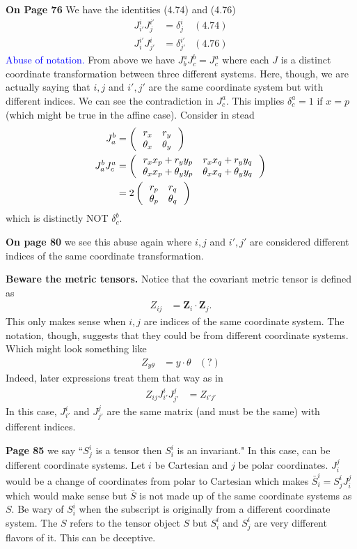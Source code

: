 \documentclass[12pt,a4paper]{report}
\newcommand{\BLUE}[1]{\textcolor{blue}{#1}}
\newcommand{\VK}[1]{\textbf{#1}}
\begin{document}
\begin{description}
	\item \textbf{On Page 76} We have the identities (4.74) and (4.76)
	\begin{align*}
		J^i_{i'}J^{i'}_j &= \delta^i_j & (4.74)\\
		J^{i'}_iJ^i_{j'} &= \delta^{i'}_{j'} & (4.76)
	\end{align*}\BLUE{Abuse of notation.}  From above we have $J^a_bJ^b_c = J^a_c$ where each $J$ is a distinct coordinate transformation between three different systems.  Here, though, we are actually saying that $i,j$ and $i',j'$ are the same coordinate system but with different indices.  We can see the contradiction in $J^a_c$.  This implies $\delta^a_c = 1$ if $x=p$ (which might be true in the affine case).  Consider in stead
	\begin{align*}
		J^b_a &= \left (\,  \begin{array}{c c} r_x&r_y \\ \theta_x & \theta_y \end{array}  \,\right ) \\
		J^b_a J^a_c &= \left (\,  \begin{array}{c c} r_xx_p+r_yy_p&r_xx_q+r_yy_q \\ \theta_xx_p+\theta_yy_p & \theta_xx_q+\theta_yy_q \end{array}  \,\right ) \\
		&= 2\left (\,  \begin{array}{c c} r_p&r_q \\ \theta_p & \theta_q \end{array}  \,\right )
	\end{align*}which is distinctly NOT $\delta^b_c$.
	
	\item \textbf{On page 80} we see this abuse again where $i,j$ and $i',j'$ are considered different indices of the same coordinate transformation.
	
	\item \textbf{Beware the metric tensors.}  Notice that the covariant metric tensor is defined as
	\begin{align*}
		Z_{ij} &= \VK{Z}_i\cdot\VK{Z}_j.
	\end{align*}This only makes sense when $i,j$ are indices of the same coordinate system.  The notation, though, suggests that they could be from different coordinate systems.  Which might look something like
	\begin{align*}
		Z_{y\theta} &= y\cdot \theta &(?)
	\end{align*}Indeed, later expressions treat them that way as in 
	\begin{align*}
		Z_{ij}J^i_{i'}J^j_{j'} &= Z_{i'j'}
	\end{align*}In this case, $J^i_{i'}$ and $J^j_{j'}$ are the same matrix (and must be the same) with different indices.
	
	\item \textbf{Page 85} we say ``$S^i_j$ is a tensor then $S^i_i$ is an invariant."  In this case, can be different coordinate systems.  Let $i$ be Cartesian and $j$ be polar coordinates.  $J^j_i$ would be a change of coordinates from polar to Cartesian which makes $\bar{S}^i_i=S^i_jJ^j_i$ which would make sense but $\bar{S}$ is not made up of the same coordinate systems as $S$.  Be wary of $S^i_i$ when the subscript is originally from a different coordinate system.  The $S$ refers to the tensor object $S$ but $S^i_i$ and $S^i_j$ are very different flavors of it.  This can be deceptive.
	

\end{description}
\end{document}
